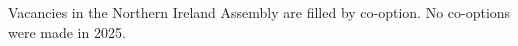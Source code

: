 \documentclass[a4paper,openany]{book}
\begin{document}
Vacancies in the Northern Ireland Assembly are filled by co-option.
No co-options were made in 2025.
%

%
%
\end{document}
